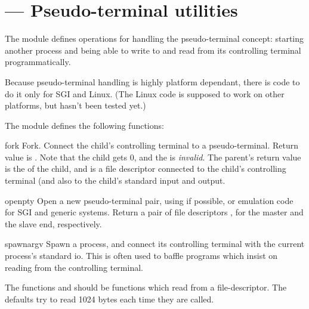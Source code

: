 \section{ ---
         Pseudo-terminal utilities}


The  module defines operations for handling the
pseudo-terminal concept: starting another process and being able to
write to and read from its controlling terminal programmatically.

Because pseudo-terminal handling is highly platform dependant, there
is code to do it only for SGI and Linux. (The Linux code is supposed
to work on other platforms, but hasn't been tested yet.)

The  module defines the following functions:

\begin{funcdesc}{fork}{}
Fork. Connect the child's controlling terminal to a pseudo-terminal.
Return value is . Note that the child 
gets  0, and the  is \emph{invalid}. The parent's
return value is the  of the child, and  is a file
descriptor connected to the child's controlling terminal (and also
to the child's standard input and output.
\end{funcdesc}

\begin{funcdesc}{openpty}{}
Open a new pseudo-terminal pair, using  if
possible, or emulation code for SGI and generic \UNIX{} systems.
Return a pair of file descriptors ,
for the master and the slave end, respectively.
\end{funcdesc}

\begin{funcdesc}{spawn}{argv}
Spawn a process, and connect its controlling terminal with the current 
process's standard io. This is often used to baffle programs which
insist on reading from the controlling terminal.

The functions  and  should be
functions which read from a file-descriptor. The defaults try to read
1024 bytes each time they are called.
\end{funcdesc}
